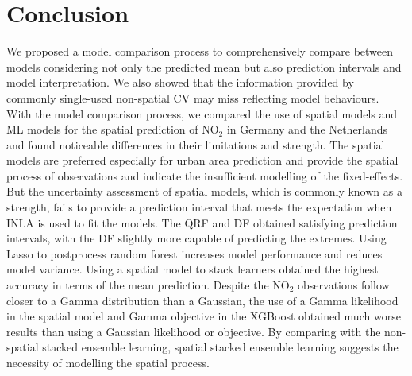 \documentclass{article}
\begin{document}
\section{Conclusion}
We proposed a model comparison process to comprehensively compare between models considering not only the predicted mean but also prediction intervals and model interpretation. We also showed that the information provided by commonly single-used non-spatial CV may miss reflecting model behaviours. With the model comparison process, we compared the use of spatial models and ML models for the spatial prediction of NO$_2$ in Germany and the Netherlands and found noticeable differences in their limitations and strength. The  spatial models are preferred especially for urban area prediction and provide the spatial process of observations and indicate the insufficient modelling of the fixed-effects. But the uncertainty assessment of spatial models, which is commonly known as a strength, fails to provide a prediction interval that meets the expectation when INLA is used to fit the models. The QRF and DF obtained satisfying prediction intervals, with the DF slightly more capable of predicting the extremes. Using Lasso to postprocess random forest increases model performance and reduces model variance. Using a spatial model to stack learners obtained the highest accuracy in terms of the mean prediction. Despite the NO$_2$ observations follow closer to a Gamma distribution than a Gaussian, the use of a Gamma likelihood in the spatial model and Gamma objective in the XGBoost obtained much worse results than using a Gaussian likelihood or objective. By comparing with the non-spatial stacked ensemble learning, spatial stacked ensemble learning suggests the necessity of modelling the spatial process.  

\newpage



\end{document}
